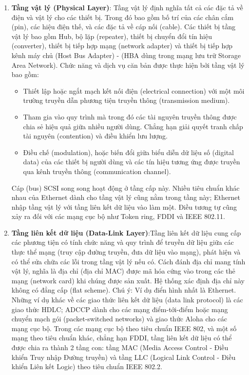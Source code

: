 \documentclass[a4paper,12pt]{article}
\begin{document}
\begin{enumerate}
    \item \textbf{Tầng vật lý (Physical Layer)}: Tầng vật lý định nghĩa tất cả các đặc tả về điện và vật lý cho các thiết bị. Trong đó bao gồm bố trí của các chân cắm (pin), các hiệu điện thế, và các đặc tả về cáp nối (cable). Các thiết bị tầng vật lý bao gồm Hub, bộ lặp (repeater), thiết bị chuyển đổi tín hiệu (converter), thiết bị tiếp hợp mạng (network adapter) và thiết bị tiếp hợp kênh máy chủ (Host Bus Adapter) - (HBA dùng trong mạng lưu trữ Storage Area Network). Chức năng và dịch vụ căn bản được thực hiện bởi tầng vật lý bao gồm:
    \begin{itemize}
        \item Thiết lập hoặc ngắt mạch kết nối điện (electrical connection) với một môi trường truyền dẫn phương tiện truyền thông (transmission medium).
        \item Tham gia vào quy trình mà trong đó các tài nguyên truyền thông được chia sẻ hiệu quả giữa nhiều người dùng. Chẳng hạn giải quyết tranh chấp tài nguyên (contention) và điều khiển lưu lượng.
        \item Điều chế (modulation), hoặc biến đổi giữa biểu diễn dữ liệu số (digital data) của các thiết bị người dùng và các tín hiệu tương ứng được truyền qua kênh truyền thông (communication channel).
    \end{itemize}
    Cáp (bus) SCSI song song hoạt động ở tầng cấp này. Nhiều tiêu chuẩn khác nhau của Ethernet dành cho tầng vật lý cũng nằm trong tầng này; Ethernet nhập tầng vật lý với tầng liên kết dữ liệu vào làm một. Điều tương tự cũng xảy ra đối với các mạng cục bộ như Token ring, FDDI và IEEE 802.11.




    
    \item \textbf{Tầng liên kết dữ liệu (Data-Link Layer)}:Tầng liên kết dữ liệu cung cấp các phương tiện có tính chức năng và quy trình để truyền dữ liệu giữa các thực thể mạng (truy cập đường truyền, đưa dữ liệu vào mạng), phát hiện và có thể sửa chữa các lỗi trong tầng vật lý nếu có. Cách đánh địa chỉ mang tính vật lý, nghĩa là địa chỉ (địa chỉ MAC) được mã hóa cứng vào trong các thẻ mạng (network card) khi chúng được sản xuất. Hệ thống xác định địa chỉ này không có đẳng cấp (flat scheme). Chú ý: Ví dụ điển hình nhất là Ethernet. Những ví dụ khác về các giao thức liên kết dữ liệu (data link protocol) là các giao thức HDLC; ADCCP dành cho các mạng điểm-tới-điểm hoặc mạng chuyển mạch gói (packet-switched networks) và giao thức Aloha cho các mạng cục bộ. Trong các mạng cục bộ theo tiêu chuẩn IEEE 802, và một số mạng theo tiêu chuẩn khác, chẳng hạn FDDI, tầng liên kết dữ liệu có thể được chia ra thành 2 tầng con: tầng MAC (Media Access Control - Điều khiển Truy nhập Đường truyền) và tầng LLC (Logical Link Control - Điều khiển Liên kết Logic) theo tiêu chuẩn IEEE 802.2.


\end{enumerate}
\end{document}
